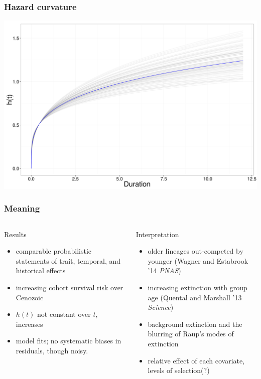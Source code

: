 \documentclass{beamer}
\begin{document}
\begin{frame}
  \frametitle{Hazard curvature}
  \begin{center}
    \includegraphics[height = 0.8\textheight, width = \textwidth,  keepaspectratio = true]{figure/haz_est}
  \end{center}
\end{frame}

\begin{frame}
  \frametitle{Meaning}
  \begin{columns}
    \begin{column}{0.5\textwidth}
      Results
      \begin{itemize}
        \item comparable probabilistic statements of trait, temporal, and historical effects
        \item increasing cohort survival risk over Cenozoic
        \item \(h(t)\) not constant over \(t\), increases
        \item model fits; no systematic biases in residuals, though noisy.
      \end{itemize}
    \end{column}
    \begin{column}{0.5\textwidth}
      Interpretation
      \begin{itemize}
        \item older lineages out-competed by younger (Wagner and Estabrook '14 \textit{PNAS})
        \item increasing extinction with group age (Quental and Marshall '13 \textit{Science})
        \item background extinction and the blurring of Raup's modes of extinction
        \item relative effect of each covariate, levels of selection(?)
      \end{itemize}
    \end{column}
  \end{columns}
\end{frame}
\end{document}
